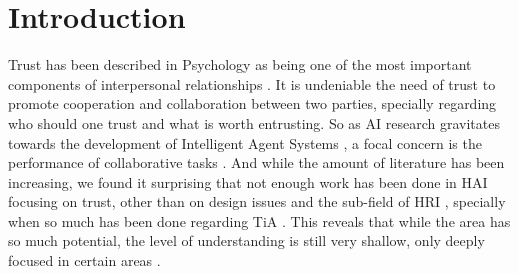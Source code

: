 \section{Introduction}
\label{sec:Introduction}

Trust has been described in Psychology as being one of the most important components of interpersonal relationships \cite{Simpson2007}. It is undeniable the need of trust to promote cooperation and collaboration between two parties, specially regarding who should one trust and what is worth entrusting. So as \ac{AI} research gravitates towards the development of Intelligent Agent Systems \cite{Russell2009a}, a focal concern is the performance of collaborative tasks \cite{Grosz1996, Allen2002, Allen2007}. And while the amount of literature has been increasing, we found it surprising that not enough work has been done in \ac{HAI} focusing on trust, other than on design issues \cite{Bickmore2005} and the sub-field of \ac{HRI} \cite{Goodrich2007, VandenBrule2014}, specially when so much has been done regarding \ac{TiA} \cite{Lee1992, Jones1997, Lee2004}. This reveals that while the area has so much potential, the level of understanding is still very shallow, only deeply focused in certain areas \cite{Granatyr2015}.

